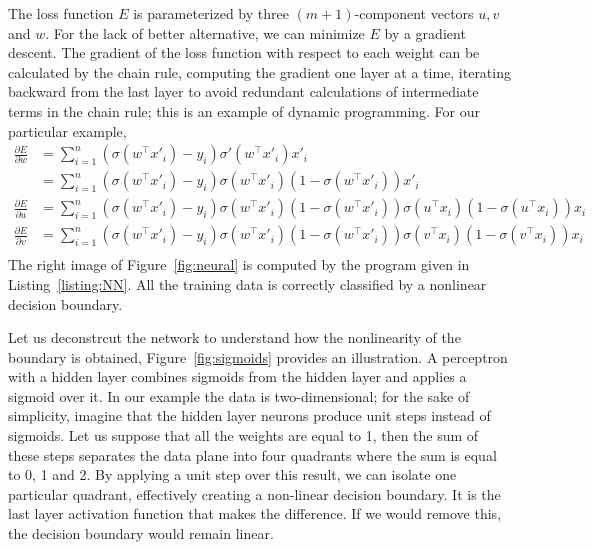 \documentclass[notitlepage,oneside]{book}
\begin{document}
The loss function $E$ is parameterized by three $(m+1)$-component vectors $u, v$ and $w$.
For the lack of better alternative, we can minimize $E$ by a gradient descent.
The gradient of the loss function with respect to each weight can be calculated by the chain rule, computing the gradient one layer at a time,
iterating backward from the last layer to avoid redundant calculations of intermediate terms in the chain rule; this is an example of dynamic programming.
For our particular example, 
\begin{align*}
\frac{\partial E}{\partial w} & =  \sum_{i=1}^{n} \left(\sigma\left(w^\top x'_i\right)  - y_i\right) \sigma'\left(w^\top x'_i\right)  x'_i \\
                              & =  \sum_{i=1}^{n} \left(\sigma\left(w^\top x'_i\right)  - y_i\right) \sigma\left(w^\top x'_i\right) (1-\sigma\left(w^\top x'_i\right) ) x'_i \\
\frac{\partial E}{\partial u} & =  \sum_{i=1}^{n} \left(\sigma\left(w^\top x'_i\right)  - y_i\right) \sigma\left(w^\top x'_i\right) (1-\sigma\left(w^\top x'_i\right) ) \sigma\left(u^\top x_i\right) (1-\sigma\left(u^\top x_i\right) ) x_i \\
\frac{\partial E}{\partial v} & =  \sum_{i=1}^{n} \left(\sigma\left(w^\top x'_i\right)  - y_i\right) \sigma\left(w^\top x'_i\right) (1-\sigma\left(w^\top x'_i\right) ) \sigma\left(v^\top x_i\right) (1-\sigma\left(v^\top x_i\right) ) x_i \\
\end{align*}
The right image of Figure~\ref{fig:neural} is computed by the program given in Listing~\ref{listing:NN}.
All the training data is correctly classified by a nonlinear decision boundary.

Let us deconstrcut the network to understand how the nonlinearity of the boundary is obtained, Figure~\ref{fig:sigmoids} provides an illustration.
A perceptron with a hidden layer combines sigmoids from the hidden layer and applies a sigmoid over it.
In our example the data is two-dimensional; for the sake of simplicity, imagine that the hidden layer neurons produce unit steps instead of sigmoids.
Let us suppose that all the weights are equal to 1, then the sum of these steps separates the data plane into four quadrants where the sum is equal to 0, 1 and 2.
By applying a unit step over this result, we can isolate one particular quadrant, effectively creating a non-linear decision boundary.
It is the last layer activation function that makes the difference.
If we would remove this, the decision boundary would remain linear.
\end{document}
